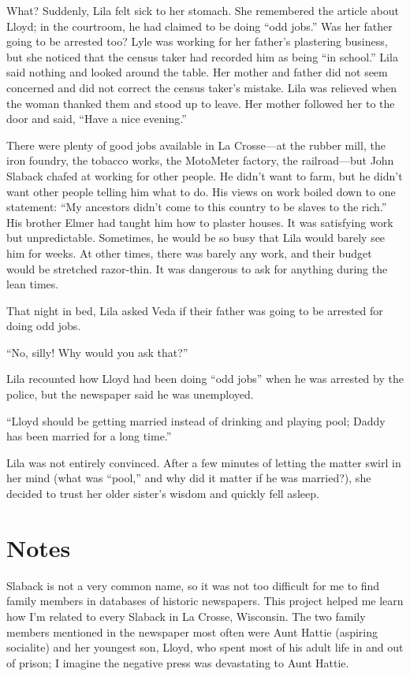 \documentclass[
  letterpaper,
]{book}
\begin{document}
What? Suddenly, Lila felt sick to her stomach. She remembered the
article about Lloyd; in the courtroom, he had claimed to be doing ``odd
jobs.'' Was her father going to be arrested too? Lyle was working for
her father's plastering business, but she noticed that the census taker
had recorded him as being ``in school.'' Lila said nothing and looked
around the table. Her mother and father did not seem concerned and did
not correct the census taker's mistake. Lila was relieved when the woman
thanked them and stood up to leave. Her mother followed her to the door
and said, ``Have a nice evening.''

There were plenty of good jobs available in La Crosse---at the rubber
mill, the iron foundry, the tobacco works, the MotoMeter factory, the
railroad---but John Slaback chafed at working for other people. He
didn't want to farm, but he didn't want other people telling him what to
do. His views on work boiled down to one statement: ``My ancestors
didn't come to this country to be slaves to the rich.'' His brother
Elmer had taught him how to plaster houses. It was satisfying work but
unpredictable. Sometimes, he would be so busy that Lila would barely see
him for weeks. At other times, there was barely any work, and their
budget would be stretched razor-thin. It was dangerous to ask for
anything during the lean times.

That night in bed, Lila asked Veda if their father was going to be
arrested for doing odd jobs.

``No, silly! Why would you ask that?''

Lila recounted how Lloyd had been doing ``odd jobs'' when he was
arrested by the police, but the newspaper said he was unemployed.

``Lloyd should be getting married instead of drinking and playing pool;
Daddy has been married for a long time.''

Lila was not entirely convinced. After a few minutes of letting the
matter swirl in her mind (what was ``pool,'' and why did it matter if he
was married?), she decided to trust her older sister's wisdom and
quickly fell asleep.

\section{Notes}\label{notes-9}

Slaback is not a very common name, so it was not too difficult for me to
find family members in databases of historic newspapers. This project
helped me learn how I'm related to every Slaback in La Crosse,
Wisconsin. The two family members mentioned in the newspaper most often
were Aunt Hattie (aspiring socialite) and her youngest son, Lloyd, who
spent most of his adult life in and out of prison; I imagine the
negative press was devastating to Aunt Hattie.
\end{document}
